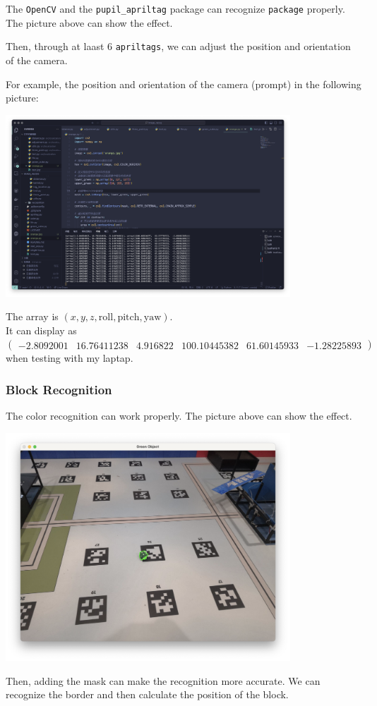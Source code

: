 \documentclass{article}
\begin{document}
The \texttt{OpenCV} and the \texttt{pupil\_apriltag} package can recognize \texttt{package} properly. The picture above can show the effect.

Then, through at laast $6$ \texttt{apriltags}, we can adjust the position and orientation of the camera.

For example, the position and orientation of the camera (prompt) in the following picture:

\includegraphics[width=0.8\textwidth]{figure/l-2.png}

The array is $\left(x,y,z,\mathrm{roll},\mathrm{pitch},\mathrm{yaw}\right)$.\\\indent It can display as $\left(\begin{matrix}-2.8092001&16.76411238&4.916822&100.10445382&61.60145933&-1.28225893\end{matrix}\right)$ when testing with my laptap.

\subsubsection{Block Recognition}

The color recognition can work properly. The picture above can show the effect.

\includegraphics[width=0.8\textwidth]{figure/r-1.png}

Then, adding the mask can make the recognition more accurate. We can recognize the border and then calculate the position of the block.
\end{document}
